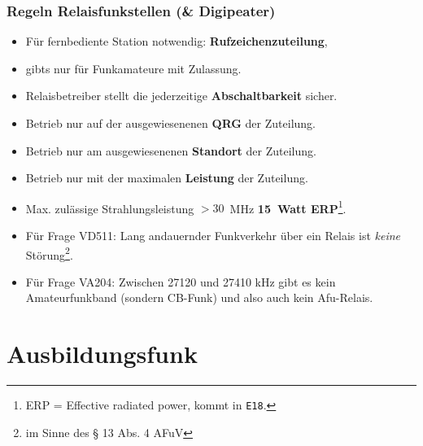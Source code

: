 \begin{frame}
  \frametitle{Regeln Relaisfunkstellen (\& Digipeater)}

  \begin{itemize}[<+->]
    \item Für fernbediente Station notwendig: \textbf{Rufzeichenzuteilung},
    \item gibts nur für Funkamateure mit Zulassung.
    \item Relaisbetreiber stellt die jederzeitige \textbf{Abschaltbarkeit} sicher.
    \item Betrieb nur auf der ausgewiesenenen \textbf{QRG} der Zuteilung.
    \item Betrieb nur am ausgewiesenenen \textbf{Standort} der Zuteilung.
    \item Betrieb nur mit der maximalen \textbf{Leistung} der Zuteilung.
    \item Max. zulässige Strahlungsleistung $>30$~MHz \textbf{15~Watt
      ERP}\footnote{ERP = Effective radiated power, kommt in \texttt{E18}.}.
    \item Für Frage VD511: Lang andauernder Funkverkehr über ein Relais
      ist \emph{keine} Störung\footnote{im Sinne des § 13 Abs. 4 AFuV}.
    \item Für Frage VA204: Zwischen 27120 und 27410 kHz gibt es kein
      Amateurfunkband (sondern CB-Funk) und also auch kein Afu-Relais.
  \end{itemize}

\end{frame}

\section{Ausbildungsfunk}

